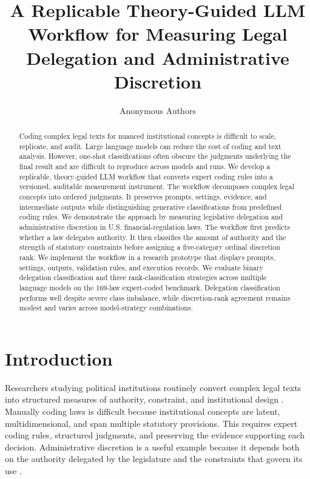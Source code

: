 \documentclass[runningheads]{llncs}
\title{A Replicable Theory-Guided LLM Workflow for Measuring Legal Delegation and Administrative Discretion}
\author{Anonymous Authors}
\institute{}
\begin{document}
\maketitle
\vspace{-0.7 cm}

\begin{abstract}

Coding complex legal texts for nuanced institutional concepts is difficult to scale, replicate, and audit. Large language models can reduce the cost of coding and text analysis. However, one-shot classifications often obscure the judgments underlying the final result and are difficult to reproduce across models and runs. We develop a replicable, theory-guided LLM workflow that converts expert coding rules into a versioned, auditable measurement instrument. The workflow decomposes complex legal concepts into ordered judgments. It preserves prompts, settings, evidence, and intermediate outputs while distinguishing generative classifications from predefined coding rules. We demonstrate the approach by measuring legislative delegation and administrative discretion in U.S. financial-regulation laws. The workflow first predicts whether a law delegates authority. It then classifies the amount of authority and the strength of statutory constraints before assigning a five-category ordinal discretion rank. We implement the workflow in a research prototype that displays prompts, settings, outputs, validation rules, and execution records. We evaluate binary delegation classification and three rank-classification strategies across multiple language models on the 169-law expert-coded benchmark. Delegation classification performs well despite severe class imbalance, while discretion-rank agreement remains modest and varies across model-strategy combinations.

\end{abstract}



\vspace{-0.2 cm}
\section{Introduction}
\vspace{-0.2 cm}
Researchers studying political institutions routinely convert complex legal texts into structured measures of authority, constraint, and institutional design \cite{grimmer2013text}. Manually coding laws is difficult because institutional concepts are latent, multidimensional, and span multiple statutory provisions. This requires expert coding rules, structured judgments, and preserving the evidence supporting each decision. 
Administrative discretion is a useful example because it depends both on the authority delegated by the legislature and the constraints that govern its use \cite{epstein1999delegating,ohalloran2015banking}.
\end{document}
